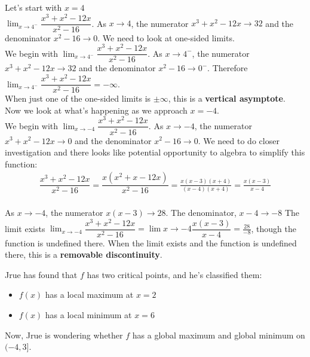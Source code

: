 \documentclass{article}
\begin{document}
\begin{enumerate}
\begin{enumerate}
\begin{solution}
    Let's start with $x=4$\\
    
    $\lim_{x\to4^-} \dfrac{x^3 + x^2 - 12 x}{x^2 - 16}$. As $x\to 4$, the numerator $x^3+x^2-12x \to 32$ and the denominator $x^2-16\to 0$. We need to look at one-sided limits.\\
    
    We begin with $\lim_{x\to4^-} \dfrac{x^3 + x^2 - 12 x}{x^2 - 16}$. As $x\to 4^-$, the numerator $x^3+x^2-12x \to 32$ and the denominator $x^2-16\to 0^-$. Therefore $\lim_{x\to4^-} \dfrac{x^3 + x^2 - 12 x}{x^2 - 16}=-\infty$.\\
    
    When just one of the one-sided limits is $\pm \infty$, this is a {\bf vertical asymptote}.\\
    
    Now we look at what's happening as we approach $x=-4$.\\
    
    We begin with $\lim_{x\to-4} \dfrac{x^3 + x^2 - 12 x}{x^2 - 16}$. As $x\to -4$, the numerator $x^3+x^2-12x \to 0$ and the denominator $x^2-16\to 0$. We need to do closer investigation and there looks like potential opportunity to algebra to simplify this function:
    \begin{align*}
        \dfrac{x^3 + x^2 - 12 x}{x^2 - 16}=\dfrac{x(x^2+x-12x)}{x^2-16}=\frac{x(x-3)(x+4)}{(x-4)(x+4)}=\frac{x(x-3)}{x-4}
    \end{align*}\\
    As $x\to -4$, the numerator $x(x-3) \to 28$. The denominator, $x-4\to -8$ 
    The limit exists $\lim_{x\to-4}\dfrac{x^3 + x^2 - 12 x}{x^2 - 16}=\lim{x\to-4} \dfrac{x(x-3)}{x-4} = \frac{28}{-8}$, though the function is undefined there. When the limit exists and the function is undefined there, this is a {\bf removable discontinuity}. \\
\end{solution}
  \end{enumerate}
  Jrue has found that $f$ has two critical points, and he's classified them:
  \begin{itemize}[nosep]
  \item $f(x)$ has a local maximum at $x = 2$
  \item $f(x)$ has a local minimum at $x = 6$
  \end{itemize}
  Now, Jrue is wondering whether $f$ has a global maximum and global minimum on $(-4, 3]$.
  \begin{enumerate}[resume]


\end{enumerate}
\end{enumerate}
\end{document}
